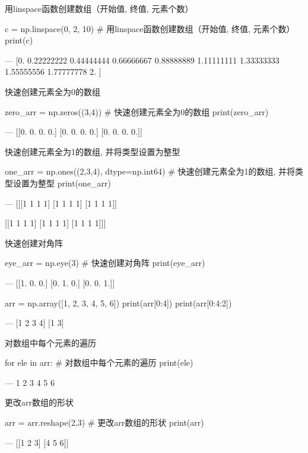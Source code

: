 用linspace函数创建数组（开始值, 终值, 元素个数）

\begin{python}
c = np.linspace(0, 2, 10)   # 用linspace函数创建数组（开始值, 终值, 元素个数）
print(c)

---
[0.         0.22222222 0.44444444 0.66666667 0.88888889 1.11111111
 1.33333333 1.55555556 1.77777778 2.        ]
\end{python}

快速创建元素全为0的数组

\begin{python}
zero_arr = np.zeros((3,4))   # 快速创建元素全为0的数组
print(zero_arr)

---
[[0. 0. 0. 0.]
 [0. 0. 0. 0.]
 [0. 0. 0. 0.]]
\end{python}

快速创建元素全为1的数组, 并将类型设置为整型

\begin{python}
one_arr = np.ones((2,3,4), dtype=np.int64)   # 快速创建元素全为1的数组, 并将类型设置为整型
print(one_arr)

---
[[[1 1 1 1]
  [1 1 1 1]
  [1 1 1 1]]

 [[1 1 1 1]
  [1 1 1 1]
  [1 1 1 1]]]
\end{python}

快速创建对角阵 

\begin{python}
eye_arr = np.eye(3)   # 快速创建对角阵 
print(eye_arr)

---
[[1. 0. 0.]
 [0. 1. 0.]
 [0. 0. 1.]]
\end{python}

\begin{python}
arr = np.array([1, 2, 3, 4, 5, 6])
print(arr[0:4])      
print(arr[0:4:2])

---
[1 2 3 4]
[1 3]
\end{python}

对数组中每个元素的遍历

\begin{python}
for ele in arr:     # 对数组中每个元素的遍历
    print(ele)
    
---
1
2
3
4
5
6
\end{python}

更改arr数组的形状

\begin{python}
arr = arr.reshape(2,3)     # 更改arr数组的形状
print(arr)

---
[[1 2 3]
 [4 5 6]]
\end{python}

